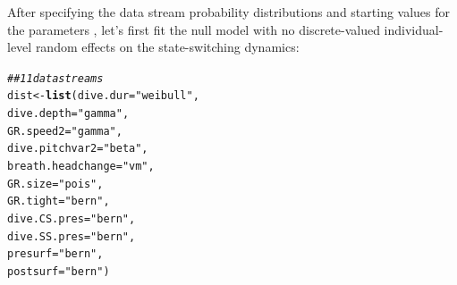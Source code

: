 \documentclass[12pt]{article}\usepackage[]{graphicx}\usepackage[]{xcolor}
\makeatletter
\newcommand{\hlsng}[1]{\textcolor[rgb]{0.192,0.494,0.8}{#1}}%
\newcommand{\hlcom}[1]{\textcolor[rgb]{0.678,0.584,0.686}{\textit{#1}}}%
\newcommand{\hldef}[1]{\textcolor[rgb]{0.345,0.345,0.345}{#1}}%
\newcommand{\hlkwb}[1]{\textcolor[rgb]{0.69,0.353,0.396}{#1}}%
\newcommand{\hlkwc}[1]{\textcolor[rgb]{0.333,0.667,0.333}{#1}}%
\newcommand{\hlkwd}[1]{\textcolor[rgb]{0.737,0.353,0.396}{\textbf{#1}}}%
\newenvironment{kframe}{%
 \def\at@end@of@kframe{}%
 \ifinner\ifhmode%
  \def\at@end@of@kframe{\end{minipage}}%
  \begin{minipage}{\columnwidth}%
 \fi\fi%
 \def\FrameCommand##1{\hskip\@totalleftmargin \hskip-\fboxsep
 \colorbox{shadecolor}{##1}\hskip-\fboxsep
     \hskip-\linewidth \hskip-\@totalleftmargin \hskip\columnwidth}%
 \MakeFramed {\advance\hsize-\width
   \@totalleftmargin\z@ \linewidth\hsize
   \@setminipage}}%
 {\par\unskip\endMakeFramed%
 \at@end@of@kframe}
\newenvironment{knitrout}{}{} %
\makeatother
\begin{document}
After specifying the data stream probability distributions and starting values for the parameters \citep[based on those reported by ][]{IsojunnoEtAl2017}, let's first fit the null model with no discrete-valued individual-level random effects on the state-switching dynamics:
\begin{knitrout}
\color{fgcolor}\begin{kframe}
\begin{alltt}
\hlcom{## 11 data streams}
\hldef{dist} \hlkwb{<-} \hlkwd{list}\hldef{(}\hlkwc{dive.dur} \hldef{=} \hlsng{"weibull"}\hldef{,}
             \hlkwc{dive.depth} \hldef{=} \hlsng{"gamma"}\hldef{,}
             \hlkwc{GR.speed2} \hldef{=} \hlsng{"gamma"}\hldef{,}
             \hlkwc{dive.pitchvar2} \hldef{=} \hlsng{"beta"}\hldef{,}
             \hlkwc{breath.headchange} \hldef{=} \hlsng{"vm"}\hldef{,}
             \hlkwc{GR.size} \hldef{=} \hlsng{"pois"}\hldef{,}
             \hlkwc{GR.tight} \hldef{=} \hlsng{"bern"}\hldef{,}
             \hlkwc{dive.CS.pres} \hldef{=} \hlsng{"bern"}\hldef{,}
             \hlkwc{dive.SS.pres} \hldef{=} \hlsng{"bern"}\hldef{,}
             \hlkwc{presurf} \hldef{=} \hlsng{"bern"}\hldef{,}
             \hlkwc{postsurf} \hldef{=} \hlsng{"bern"}\hldef{)}


\end{alltt}
\end{kframe}
\end{knitrout}
\end{document}
